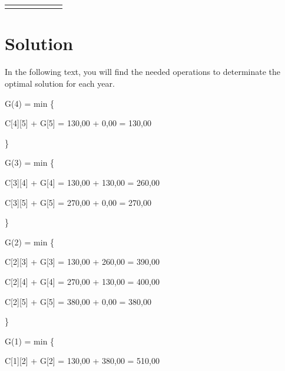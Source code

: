 \documentclass{article}
\begin{document}
\begin{center}
\begin{adjustbox}{max width=\textwidth}
\begin{tabular}{|c||c|c|c|c|c|c|}
        \hline
        \cellcolor{DonCangrejo}{\textbf{\textcolor{white}{i=4}}}& \cellcolor{CangrejoInside}{$-$} & \cellcolor{CangrejoInside}{$-$} & \cellcolor{CangrejoInside}{$-$} & \cellcolor{CangrejoInside}{$-$} & \cellcolor{CangrejoInside}{$-$} & \cellcolor{CangrejoInside}{$130,00$ \$}\\
        \hline
        \cellcolor{DonCangrejo}{\textbf{\textcolor{white}{i=5}}}& \cellcolor{CangrejoInside}{$-$} & \cellcolor{CangrejoInside}{$-$} & \cellcolor{CangrejoInside}{$-$} & \cellcolor{CangrejoInside}{$-$} & \cellcolor{CangrejoInside}{$-$} & \cellcolor{CangrejoInside}{$-$} \\
        \hline
    \end{tabular}
\end{adjustbox}


\end{center}



\section{Solution}
In the following text, you will find the needed operations to determinate the optimal solution for each year.

G(4) = min \{ 

\hspace{1cm} C[4][5] + G[5] = 130,00 + 0,00 = 130,00 

 \} 


G(3) = min \{ 

\hspace{1cm} C[3][4] + G[4] = 130,00 + 130,00 = 260,00 

\hspace{1cm} C[3][5] + G[5] = 270,00 + 0,00 = 270,00 

 \} 


G(2) = min \{ 

\hspace{1cm} C[2][3] + G[3] = 130,00 + 260,00 = 390,00 

\hspace{1cm} C[2][4] + G[4] = 270,00 + 130,00 = 400,00 

\hspace{1cm} C[2][5] + G[5] = 380,00 + 0,00 = 380,00 

 \} 


G(1) = min \{ 

\hspace{1cm} C[1][2] + G[2] = 130,00 + 380,00 = 510,00 
\end{document}
